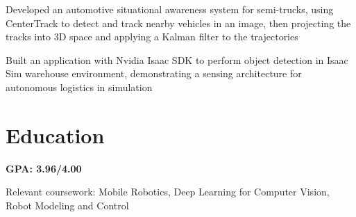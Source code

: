 \documentclass{resume}
\begin{document}
\begin{details}
  \item Developed an automotive situational awareness system for semi-trucks, using CenterTrack to detect
  and track nearby vehicles in an image, then projecting the tracks into 3D space and applying a
  Kalman filter to the trajectories
  \item Built an application with Nvidia Isaac SDK to perform object detection in Isaac Sim warehouse
  environment, demonstrating a sensing architecture for autonomous logistics in simulation
\end{details}



\section{Education}

\begin{details}
  \item \textbf{GPA: 3.96/4.00}
  \item Relevant coursework: Mobile Robotics, Deep Learning for Computer Vision, Robot Modeling and Control
\end{details}
\end{document}
